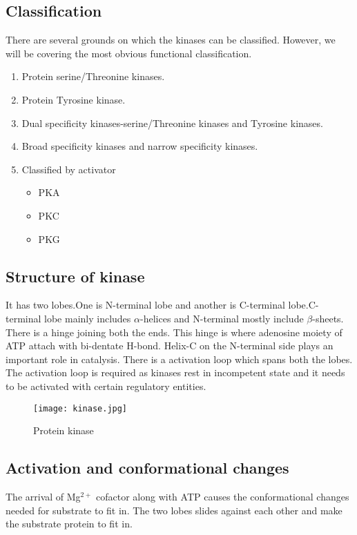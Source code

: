 \documentclass[12pt]{article}
\begin{document}
\subsection{Classification}
There are several grounds on which the kinases can be classified. However, we will be covering the most obvious functional classification.
\begin{enumerate}
\item Protein serine/Threonine kinases.
\item Protein Tyrosine kinase.

\item Dual specificity kinases-serine/Threonine kinases and Tyrosine kinases.
\item Broad specificity kinases and narrow specificity kinases.
\item Classified by activator 
\begin{itemize}
\item PKA
\item PKC
\item PKG
\end{itemize}
\end{enumerate}
\clearpage
\subsection{Structure of kinase}
It has two lobes.One is N-terminal lobe and another is C-terminal lobe.C-terminal lobe mainly includes $\alpha$-helices and N-terminal mostly include $\beta$-sheets. There is a hinge joining both the ends. This hinge is where adenosine moiety of ATP attach with bi-dentate H-bond.
Helix-C on the N-terminal side plays an important role in catalysis. There is a activation loop which spans both the lobes. The activation loop is required as kinases rest in incompetent state and it needs to be activated with certain regulatory entities.
\begin{figure}[h]
\centering
\texttt{[image: kinase.jpg]}
\caption{Protein kinase}

\end{figure}
\clearpage
\subsection{Activation and conformational changes}
The arrival of Mg$^{2+}$ cofactor along with ATP causes the conformational changes needed for substrate to fit in. The two lobes slides against each other and make the substrate protein to fit in.
\end{document}
